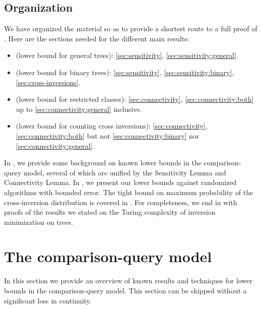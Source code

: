 \subsection{Organization} 
%
We have organized the material so as to provide a shortest route to a full proof of . Here are the sections needed for the different main results:
\begin{itemize}
\item {} (lower bound for general trees): \ref{sec:sensitivity}, \ref{sec:sensitivity:general}.
\item {} (lower bound for binary trees):  \ref{sec:sensitivity}, \ref{sec:sensitivity:binary}, \ref{sec:cross-inversions}.
\item {} (lower bound for restricted classes): \ref{sec:connectivity}, \ref{sec:connectivity:both} up to \ref{sec:connectivity:general} inclusive.
\item {} (lower bound for counting cross inversions): \ref{sec:connectivity}, \ref{sec:connectivity:both} but not \ref{sec:connectivity:binary} nor \ref{sec:connectivity:general}.
\end{itemize}
In , we provide some background on known lower bounds in the comparison-query model, several of which are unified by the Sensitivity Lemma and Connectivity Lemma. In , we present our lower bounds against randomized algorithms with bounded error. The tight bound on maximum probability of the cross-inversion distribution is covered in . For completeness, we end in  with proofs of the results we stated on the Turing complexity of inversion minimization on trees.



\section{The comparison-query model}
\label{sec:model}
%

In this section we provide an overview of known results and techniques for lower bounds in the comparison-query model. This section can be skipped without a significant loss in continuity.

